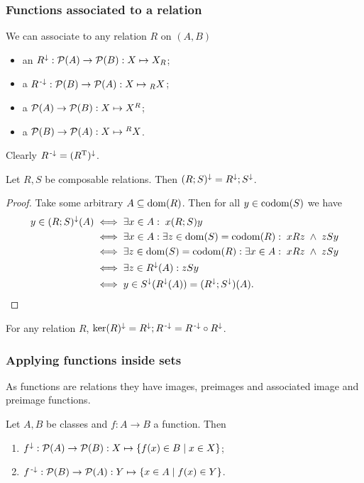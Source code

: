 \subsubsection{Functions associated to a relation}
We can associate to any relation $R$ on $(A,B)$
\begin{itemize}
\item an  $R^{\downarrow}: \operatorname{\mathcal{P}}(A) \to \operatorname{\mathcal{P}}(B): X \mapsto X_R$;
\item a  $R^{{\text{\hspace{0.15em}-}\downarrow}}: \operatorname{\mathcal{P}}(B) \to \operatorname{\mathcal{P}}(A): X \mapsto {_RX}$;
\item a  $\operatorname{\mathcal{P}}(A) \to \operatorname{\mathcal{P}}(B): X \mapsto X^R$;
\item a  $\operatorname{\mathcal{P}}(B) \to \operatorname{\mathcal{P}}(A): X \mapsto {^RX}$.
\end{itemize}

Clearly $R^{{\text{\hspace{0.15em}-}\downarrow}} = (R^{\mathrm{T}})^\downarrow$.

\begin{lemma}
Let $R,S$ be composable relations. Then $(R;S)^\downarrow = R^\downarrow;S^\downarrow$.
\end{lemma}
\begin{proof}
Take some arbitrary $A\subseteq \operatorname{dom}(R)$. Then for all $y\in \operatorname{codom}(S)$ we have
\begin{align*}
y \in (R;S)^\downarrow(A) &\iff \exists x\in A:\; x(R;S)y \\
&\iff \exists x\in A:\exists z\in \operatorname{dom}(S) = \operatorname{codom}(R): \; xRz\;\wedge\; zSy \\
&\iff \exists z\in \operatorname{dom}(S) = \operatorname{codom}(R):\exists x\in A: \; xRz\;\wedge\; zSy \\
&\iff \exists z\in R^\downarrow(A): zSy \\
&\iff y\in S^\downarrow(R^\downarrow(A)) = (R^\downarrow;S^\downarrow)(A).
\end{align*}
\end{proof}
\begin{corollary}
For any relation $R$, $\ker(R)^\downarrow = R^\downarrow;R^{\text{\hspace{0.15em}-}\downarrow} = R^{\text{\hspace{0.15em}-}\downarrow}\circ R^\downarrow$.
\end{corollary}

\subsubsection{Applying functions inside sets}
As functions are relations they have images, preimages and associated image and preimage functions.

\begin{lemma}
Let $A,B$ be classes and $f:A\to B$ a function. Then
\begin{enumerate}
\item $f^{\downarrow}: \operatorname{\mathcal{P}}(A) \to \operatorname{\mathcal{P}}(B): X\mapsto \left\{ f(x)\in B \;\middle|\; x\in X \right\}$;
\item $f^{{\text{\hspace{0.15em}-}\downarrow}}: \operatorname{\mathcal{P}}(B) \to \operatorname{\mathcal{P}}(A): Y\mapsto \left\{ x\in A \;\middle|\; f(x) \in Y \right\}$.
\end{enumerate}
\end{lemma}

